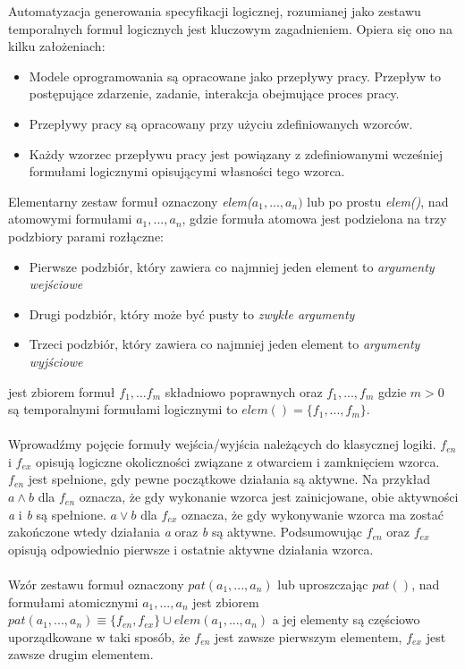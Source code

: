 \documentclass[a4paper, 11pt]{article}
\begin{document}
	Automatyzacja generowania specyfikacji logicznej, rozumianej jako zestawu temporalnych formuł logicznych jest kluczowym zagadnieniem. Opiera się ono na kilku założeniach:
	\begin{itemize}
	\item Modele oprogramowania są opracowane jako przepływy pracy. Przepływ to postępujące zdarzenie, zadanie, interakcja obejmujące proces pracy.
	\item Przepływy pracy są opracowany przy użyciu zdefiniowanych wzorców.
	\item Każdy wzorzec przepływu pracy jest powiązany z zdefiniowanymi wcześniej formułami logicznymi opisującymi własności tego wzorca.
	\end{itemize} 
	Elementarny zestaw formuł oznaczony \textit{elem($a_1,...,a_n)$} lub po prostu \textit{elem()}, nad atomowymi formułami $a_1,...,a_n$, gdzie formuła atomowa jest podzielona na trzy podzbiory parami rozłączne:
	\begin{itemize}
		\item Pierwsze podzbiór, który zawiera co najmniej jeden element to \textit{argumenty wejściowe}
		\item Drugi podzbiór, który może być pusty to \textit{zwykłe argumenty}
		\item Trzeci podzbiór, który zawiera co najmniej jeden element to \textit{argumenty wyjściowe}
	\end{itemize}
	jest zbiorem formuł \textit{$f_1,...f_m$} składniowo poprawnych oraz $f_1,...,f_m$ gdzie $m>0$ są temporalnymi formułami logicznymi to
	\textit{$elem()=\{f_1,...,f_m\}.$}
	\\
	\\
	Wprowadźmy pojęcie formuły wejścia/wyjścia należących do klasycznej logiki. $f_{en}$ i $f_{ex}$ opisują logiczne okoliczności związane z otwarciem i zamknięciem wzorca. $f_{en}$ jest spełnione, gdy pewne początkowe działania są aktywne. Na przykład $a\wedge b$ dla $f_{en}$ oznacza, że gdy wykonanie wzorca jest zainicjowane, obie aktywności \textit{a} i \textit{b} są spełnione. $a\vee b$ dla $f_{ex}$ oznacza, że gdy wykonywanie wzorca ma zostać zakończone wtedy działania \textit{a} oraz \textit{b} są aktywne. Podsumowując $f_{en}$ oraz $f_{ex}$ opisują odpowiednio pierwsze i ostatnie aktywne działania wzorca.
	\\
	\\
	Wzór zestawu formuł oznaczony \textit{$pat(a_1,...,a_n)$} lub uproszczając \textit{$pat()$}, nad formułami atomicznymi $a_1,...,a_n$ jest zbiorem $pat(a_1,...,a_n) \equiv \{f_{en},f_{ex}\} \cup elem(a_1,...,a_n)$ a jej elementy są częściowo uporządkowane w taki sposób, że $f_{en}$ jest zawsze pierwszym elementem, $f_{ex}$ jest zawsze drugim elementem.
\end{document}
